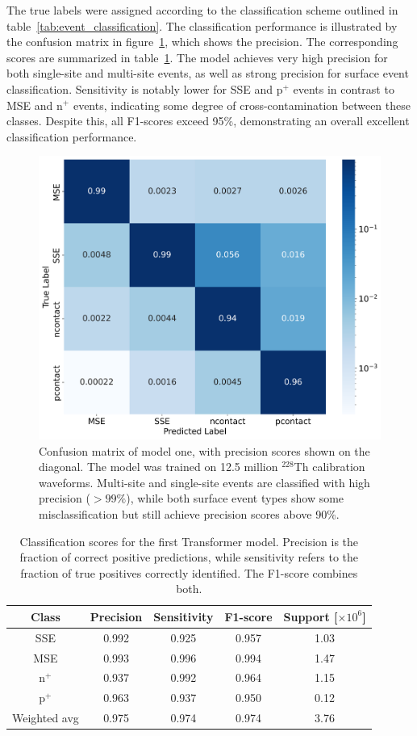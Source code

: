 The true labels were assigned according to the classification scheme outlined in table~\ref{tab:event_classification}. The classification performance is illustrated by the confusion matrix in figure~\ref{fig:Confusionmatrix_icpc_v1}, which shows the precision. The corresponding scores are summarized in table~\ref{tab:Scores_icpc_v1}. The model achieves very high precision for both single-site and multi-site events, as well as strong precision for surface event classification. Sensitivity is notably lower for SSE and p$^+$ events in contrast to MSE and n$^+$ events, indicating some degree of cross-contamination between these classes. Despite this, all F1-scores exceed 95\%, demonstrating an overall excellent classification performance.

\begin{figure}
    \centering
    \includegraphics[width=0.75\linewidth]{figures/05_PSD/Results_confusionmatrix_icpc_v1.png}
    \caption{Confusion matrix of model one, with precision scores shown on the diagonal. The model was trained on 12.5 million $^{228}$Th calibration waveforms. Multi-site and single-site events are classified with high precision ($>99\%$), while both surface event types show some misclassification but still achieve precision scores above 90\%.} 
\label{fig:Confusionmatrix_icpc_v1}
\end{figure}

\begin{table}
\centering
\caption{Classification scores for the first Transformer model. Precision is the fraction of correct positive predictions, while sensitivity refers to the fraction of true positives correctly identified. The F1-score combines both.}
\begin{tabular}{||c | c | c | c | c||} 
 \hline
 \textbf{Class} & \textbf{Precision} & \textbf{Sensitivity} & \textbf{F1-score} & \textbf{Support} [$\times 10^6$] \\ 
 \hline
 SSE & 0.992 & 0.925 & 0.957 & 1.03 \\
 \hline
 MSE & 0.993 & 0.996 & 0.994 & 1.47 \\
  \hline
 n$^+$ & 0.937 & 0.992 & 0.964 & 1.15 \\
 \hline
 p$^+$ & 0.963 & 0.937 & 0.950 & 0.12 \\
 \hline
 Weighted avg	&  0.975 & 0.974 & 0.974 & 3.76  \\ 
 \hline
\end{tabular}
\label{tab:Scores_icpc_v1}
\end{table}


